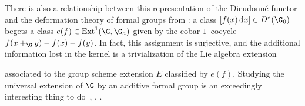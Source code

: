 \begin{remark}\label{ExtensionsPresentationOfDieudonne}
There is also a relationship between this representation of the Dieudonn\'e functor and the deformation theory of formal groups from : a class \([f(x)\dx] \in D^*(\G_0)\) begets a class \(e(f) \in \Ext^1(\G, \G_a)\) given by the cobar \(1\)--cocycle \(f(x +_{\G} y) - f(x) - f(y)\).  In fact, this assignment is surjective, and the additional information lost in the kernel is a trivialization of the Lie algebra extension
\begin{center}
\end{center}
associated to the group scheme extension \(E\) classified by \(e(f)\).  Studying the universal extension of \(\G\) by an additive formal group is an exceedingly interesting thing to do~\cite[Section V.4]{GrothendieckCristaux}, \cite{MazurMessing}, \cite[Section 11]{HopkinsGrossEquivVBs}.
\end{remark}

